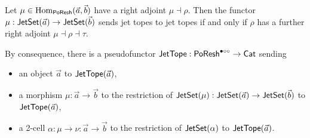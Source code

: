 \documentclass[a4paper]{memoir}
\begin{document}
\begin{theorem} \label{thm:poresh-jettope}
	Let $\mu \in {\mathrm{Hom}}_{\mathsf{PoResh}}(\vec a, \vec b)$ have a right adjoint $\mu \dashv \rho$.
	Then the functor $\mu : \mathsf{JetSet}(\vec a) \to \mathsf{JetSet}(\vec b)$ sends jet topes to jet topes if and only if $\rho$ has a further right adjoint $\mu \dashv \rho \dashv \tau$.
	
	By consequence, there is a pseudofunctor $\mathsf{JetTope} : \mathsf{PoResh}^{\bullet \circ \circ} \to {\mathsf{Cat}}$ sending
	\begin{itemize}
		\item an object $\vec a$ to $\mathsf{JetTope}(\vec a)$,
		\item a morphism $\mu : \vec a \to \vec b$ to the restriction of $\mathsf{JetSet}(\mu) : \mathsf{JetSet}(\vec a) \to \mathsf{JetSet}(\vec b)$ to $\mathsf{JetTope}(\vec a)$,
		\item a 2-cell $\alpha : \mu \to \nu : \vec a \to \vec b$ to the restriction of $\mathsf{JetSet}(\alpha)$ to $\mathsf{JetTope}(\vec a)$.
	\end{itemize}
\end{theorem}
\end{document}
